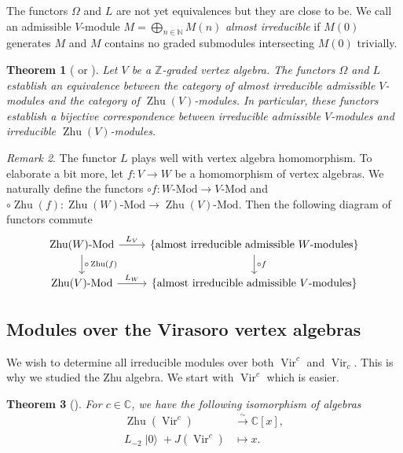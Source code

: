 \documentclass[a4paper, 12pt, reqno]{amsart}
\newtheorem{theorem}{Theorem}[section]
\theoremstyle{remark}
\newtheorem{remark}[theorem]{Remark}
\numberwithin{equation}{subsection}
\DeclareMathOperator{\Vir}{Vir}
\DeclareMathOperator{\vac}{|0\rangle}
\DeclareMathOperator{\Zhu}{Zhu}
\begin{document}
The functors $\Omega$ and $L$ are not yet equivalences but they are close to be.
We call an admissible $V$-module $M = \bigoplus_{n \in \mathbb{N}}M(n)$ \emph{almost irreducible} if $M(0)$ generates $M$ and $M$ contains no graded submodules intersecting $M(0)$ trivially.

\begin{theorem}[{\cite[\S2]{de_sole_finite_2006} or \cite{dong_twisted_1998}}]
  \label{thr:36}
  Let $V$ be a $\mathbb{Z}$-graded vertex algebra.
  The functors $\Omega$ and $L$ establish an equivalence between the category of almost irreducible admissible $V$-modules and the category of $\Zhu(V)$-modules.
  In particular, these functors establish a bijective correspondence between irreducible admissible $V$-modules and irreducible $\Zhu(V)$-modules.
\end{theorem}

\begin{remark}
  \label{rmk:31}
  The functor $L$ plays well with vertex algebra homomorphism.
  To elaborate a bit more, let $f: V \to W$ be a homomorphism of vertex algebras.
  We naturally define the functors $\circ f: W\text{-Mod} \to V\text{-Mod}$ and $\circ \Zhu(f): \Zhu(W)\text{-Mod} \to \Zhu(V)\text{-Mod}$.
  Then the following diagram of functors commute
  \begin{equation*}
    \begin{tikzcd}
      \Zhu(W)\text{-Mod} \arrow[r, "L_V"] \arrow[d, "\circ \Zhu(f)"] & \{\text{almost irreducible admissible $W$-modules}\} \arrow[d, "\circ f"] \\
      \Zhu(V)\text{-Mod} \arrow[r, "L_W"]                           & \{\text{almost irreducible admissible $V$-modules}\}
    \end{tikzcd}
  \end{equation*}
\end{remark}

\subsection{Modules over the Virasoro vertex algebras}
\label{sec:modul-over-viras}

We wish to determine all irreducible modules over both $\Vir^c$ and $\Vir_c$.
This is why we studied the Zhu algebra.
We start with $\Vir^c$ which is easier.

\begin{theorem}[{\cite{wang_rationality_1993}}]
  \label{thr:37}
  For $c \in \mathbb{C}$, we have the following isomorphism of algebras
  \begin{align*}
    \Zhu(\Vir^c) &\xrightarrow{\sim} \mathbb{C}[x], \\
    L_{-2}\vac + J(\Vir^c) &\mapsto x.
  \end{align*}
\end{theorem}
\end{document}

